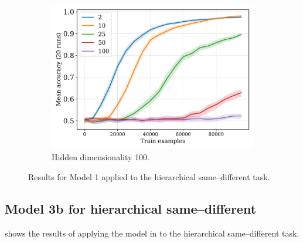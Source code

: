 \begin{figure}[H]
  \begin{subfigure}{0.45\linewidth}
    \includegraphics[width=1\textwidth]{../fig/flatpremack-h1-train_size-embed_dim-hidden_dim=100.pdf}
    \caption{Hidden dimensionality 100.}
  \end{subfigure}
  \caption{Results for Model 1 applied to the hierarchical same--different task.}
  \label{fig:model1:premack}
\end{figure}


\newpage


\subsection{Model 3b for hierarchical same--different}

 shows the results of applying the model in  to the hierarchical same--different task.

